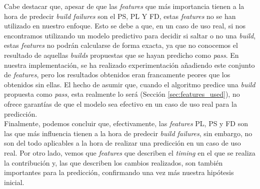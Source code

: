 Cabe destacar que, apesar de que las \textit{features} que más importancia tienen a la hora de
predecir \textit{build failures} son el PS, PL Y FD, estas \textit{features} no se han utilizado
en nuestro enfoque. Esto se debe a que, en un caso de uso real, si nos encontramos utilizando
un modelo predictivo para decidir si saltar o no una \textit{build}, estas \textit{features} no
podrán calcularse de forma exacta, ya que no conocemos el resultado de aquellas \textit{builds}
propuestas que se hayan predicho como \textit{pass}. En nuestra implementación, se ha realizado
experimentación añadiendo este conjunto de \textit{features}, pero los resultados obtenidos eran
francamente peores que los obtenidos sin ellas. El hecho de asumir que, cuando el algoritmo predice
una \textit{build} propuesta como \textit{pass}, esta realmente lo será (Sección
\ref{sec:features_used}), no ofrece garantías de que el modelo sea efectivo en un caso de uso
real para la predicción.\\

Finalmente, podemos concluir que, efectivamente, las \textit{features} PL, PS y FD son las que
más influencia tienen a la hora de predecir \textit{build failures}, sin embargo, no son del
todo aplicables a la hora de realizar una predicción en un caso de uso real. Por otro lado, vemos
que \textit{features} que describen el \textit{timing} en el que se realiza la contribución y,
las que describen los cambios realizados, son también importantes para la predicción, confirmando
una vez más nuestra hipótesis inicial.
